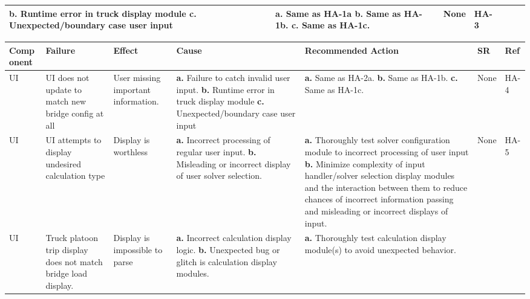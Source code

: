 \documentclass{article}
\begin{document}
\begin{landscape}
\begin{table}[H]
\begin{tabular}{|p{} | p{} | p{} | p{} | p{} | p{} | p{}|}
    \textbf{b.} Runtime error in truck display module\newline
    \textbf{c.} Unexpected/boundary case user input 
&  \textbf{a.} Same as HA-1a\newline
    \textbf{b.} Same as HA-1b.\newline
    \textbf{c.} Same as HA-1c.
    &None&HA-3\\
    \bottomrule
  \end{tabular}
  \end{table}
\pagebreak
\begin{table}[H]
    \begin{tabular}{|p{} | p{} | p{} | p{} | p{} | p{} | p{}|}
    \toprule
    \textbf{Comp onent} & \textbf{Failure} & \textbf{Effect} & \textbf{Cause} & \textbf{Recommended Action} & \textbf{SR} & \textbf{Ref}\\
\midrule
    UI & UI does not update to match new bridge config at all & User missing important information. &  \textbf{a.} Failure to catch invalid user input.\newline
    \textbf{b.} Runtime error in truck display module\newline
    \textbf{c.} Unexpected/boundary case user input 
&   \textbf{a.} Same as HA-2a.\newline
    \textbf{b.}  Same as HA-1b.\newline
    \textbf{c.} Same as HA-1c.
    &None&HA-4\\
\midrule
    UI&UI attempts to display undesired calculation type&Display is worthless&\textbf{a.} Incorrect processing of regular user input.\newline
    \textbf{b.} Misleading or incorrect display of user solver selection.
    &\textbf{a.} Thoroughly test solver configuration module to incorrect processing of user input\newline
    \textbf{b.} Minimize complexity of input handler/solver selection display modules and the interaction between them to reduce chances of incorrect information passing
     and misleading or incorrect displays of input.
    &None&HA-5\\
\midrule
    UI&Truck platoon trip display does not match bridge load display.
    &Display is impossible to parse&\textbf{a.} Incorrect calculation display logic.\newline
    \textbf{b.} Unexpected bug or glitch is calculation display modules.
&\textbf{a.} Thoroughly test calculation display module(s) to avoid unexpected behavior.\newline

\end{tabular}
\end{table}
\end{landscape}
\end{document}
